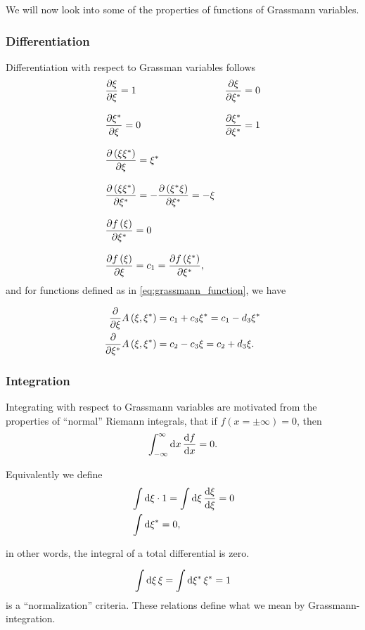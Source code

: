 We will now look into some of the properties of functions of Grassmann variables.
\subsubsection*{Differentiation}

Differentiation with respect to Grassman variables follows
\begin{align}
&\frac{\partial \xi}{\partial \xi} = 1 & \frac{\partial \xi}{\partial \xi^*} = 0   \\[2ex]
&\frac{\partial \xi^*}{\partial\xi} = 0 & \frac{\partial \xi^*}{\partial \xi^*} = 1  \\[2ex]
&\pdv{\left(\xi\xi^*\right)}{\xi} = \xi^* &  \\[2ex]
&\pdv{\left(\xi\xi^*\right)}{\xi^*} = -\pdv{\left(\xi^*\xi\right)}{\xi^*} = -\xi  \\[2ex]
&\pdv{f\left(\xi\right)}{\xi^*} = 0 &\\[2ex]
&\pdv{f\left(\xi\right)}{\xi} = c_1 = \pdv{f\left(\xi^*\right)}{\xi^*}, &
\end{align}
and for functions defined as in \eqref{eq:grassmann_function}, we have

\begin{align}
\label{eq:grassmann_derivation}
\pdv{\xi}A\left(\xi, \xi^*\right) &= c_1 + c_3\xi^* = c_1 - d_3\xi^* \\
\pdv{\xi^*}A\left(\xi, \xi^*\right) &= c_2 - c_3\xi = c_2 + d_3\xi.
\end{align}

\subsubsection*{Integration}
Integrating with respect to Grassmann variables are motivated from the properties of ``normal'' Riemann integrals, that if $f\left(x = \pm \infty\right) = 0$, then
\begin{equation}
\int_{-\infty}^{\infty}\dd{x} \dv{f}{x} = 0.
\end{equation}

Equivalently we define
\begin{align}
&\int\dd{\xi}\cdot 1 =\int\dd{\xi}\dv{\xi}{\xi} = 0 \\
&\int\dd{\xi}^* = 0,
\end{align}

in other words, the integral of a total differential is zero.

\begin{equation}
\int\dd{\xi}\xi = \int\dd{\xi^*}\xi^* = 1
\end{equation}
is a ``normalization'' criteria. These relations define what we mean by Grassmann-integration.

